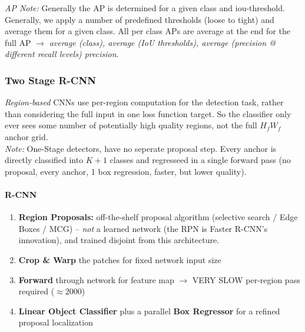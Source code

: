 \documentclass{article}
\begin{document}
\textit{AP Note:} Generally the AP is determined for a given class and iou-threshold.
Generally, we apply a number of predefined thresholds (loose to tight) and average them for a given class. 
All per class APs are average at the end for the full AP $\rightarrow$ \textit{average (class), average (IoU thresholds), average (precision @ different recall levels) precision}.

\subsubsection{Two Stage R-CNN}
\textit{Region-based} CNNs use per-region computation for the detection task, rather than considering the full input in one loss function target.
So the classifier only ever sees some number of potentially high quality regions, not the full $H_f W_f$ anchor grid.\\
\textit{Note:} One-Stage detectors, have no seperate proposal step. Every anchor is directly classified into $K+1$ classes and regresseed in a single forward pass (no proposal, every anchor, 1 box regression, faster, but lower quality).

\paragraph{R-CNN}
\begin{enumerate}
    \item \textbf{Region Proposals:} off-the-shelf proposal algorithm (selective search / Edge Boxes / MCG) -- \textit{not} a learned network (the RPN is Faster R-CNN's innovation), and trained disjoint from this architecture.
    \item \textbf{Crop \& Warp} the patches for fixed network input size
    \item \textbf{Forward} through network for feature map $\rightarrow$ VERY SLOW per-region pass required ($\approx 2000$)
    \item \textbf{Linear Object Classifier} plus a parallel \textbf{Box Regressor} for a refined proposal localization
\end{enumerate}
\end{document}
